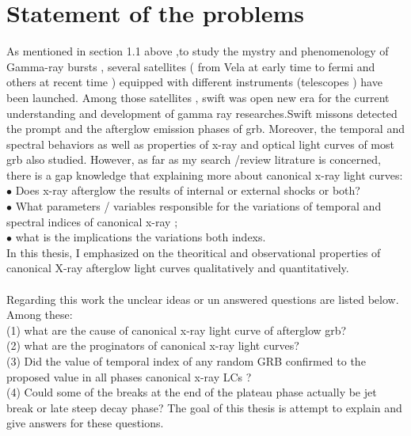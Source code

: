 \section{Statement of the problems}
As mentioned in section 1.1 above ,to study the mystry and  phenomenology of Gamma-ray bursts , several  satellites ( from Vela at early time  to  fermi and others at recent time ) equipped  with different instruments (telescopes ) have been launched. Among those satellites , swift was open new era  for the current understanding and development of gamma ray researches.Swift missons  detected  the prompt and the afterglow emission phases of grb.  Moreover, the temporal and spectral behaviors as well as  properties of x-ray and optical  light curves of most grb also studied. However, as far as my search /review litrature is concerned, there is a gap knowledge that explaining more about canonical x-ray light curves:\\
$\bullet$ Does x-ray afterglow the results of internal or external shocks or both? \\
$\bullet$ What parameters / variables responsible for the variations of temporal and spectral indices  of canonical x-ray ;\\
$\bullet$ what is the implications the variations both indexs.\\
In this thesis, I emphasized on the theoritical and observational properties of canonical X-ray afterglow light curves  qualitatively and quantitatively.\\\\
Regarding this work the unclear ideas or un answered questions are listed below. Among these:\\
(1) what are the cause of canonical x-ray light curve of afterglow grb?\\
(2) what are the proginators of canonical x-ray light curves?\\
(3) Did the  value  of temporal index  of any random GRB confirmed to the proposed value in all phases canonical x-ray LCs ?\\
(4) Could some of the breaks at the end of the plateau phase actually be jet break
or late steep decay phase? The goal of this thesis is  attempt to explain and give answers for these questions.
